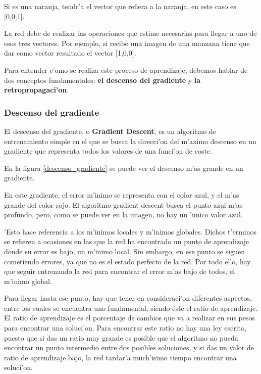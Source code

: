 Si es una naranja, tendr'a el vector que refiera a la naranja, en este caso es [0,0,1].

La red debe de realizar las operaciones que estime necesarias para llegar a uno de esos tres vectores. 
Por ejemplo, si recibe una imagen de una manzana tiene que dar como vector resultado el vector [1,0,0].

Para entender c'omo se realiza este proceso de aprendizaje, debemos hablar de dos conceptos fundamentales: \textbf{el descenso del gradiente} y \textbf{la retropropagaci'on}.

\clearpage

\subsubsection{Descenso del gradiente}

El descenso del gradiente, o \textbf{Gradient Descent}, es un algoritmo de entrenamiento simple en el que se busca la direcci'on del m'aximo descenso en un gradiente que representa todos los valores de una funci'on de coste.

En la figura \ref{descenso_gradiente} se puede ver el descenso m'as grande en un gradiente.

En este gradiente, el error m'inimo se representa con el color azul, y el m'as grande del color rojo. El algoritmo gradient descent busca el punto azul m'as profundo, pero, como se puede ver en la imagen, no hay un 'unico valor azul.

'Esto hace referencia a los m'inimos locales y m'inimos globales. Dichos t'erminos se refieren a ocasiones en las que la red ha encontrado un punto de aprendizaje donde su error es bajo, un m'inimo local. Sin embargo, en ese punto se siguen cometiendo errores, ya que no es el estado perfecto de la red. 
Por todo ello, hay que seguir entrenando la red para encontrar el error m'as bajo de todos, el m'inimo global.


\clearpage

Para llegar hasta ese punto, hay que tener en consideraci'on diferentes aspectos, entre los cuales se encuentra uno fundamental, siendo éste el ratio de aprendizaje.
El ratio de aprendizaje es el porcentaje de cambios que va a realizar en sus pesos para encontrar una soluci'on. Para encontrar este ratio no hay una ley escrita, puesto que si das un ratio muy grande es posible que el algoritmo no pueda encontrar un punto intermedio entre dos posibles soluciones, y si das un valor de ratio de aprendizaje bajo, la red tardar'a much'isimo tiempo encontrar una soluci'on.



